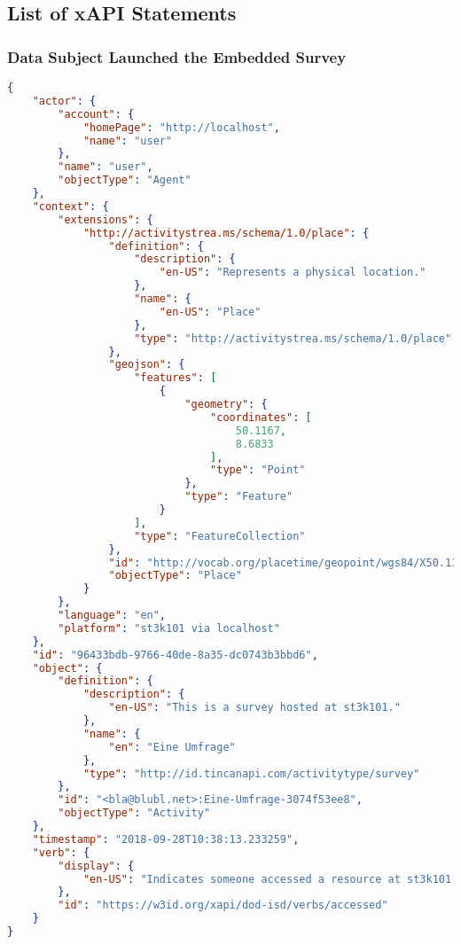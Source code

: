 \subsection{List of xAPI Statements}

\subsubsection*{Data Subject Launched the Embedded Survey}
\begin{lstlisting}[language=JSON]
{
    "actor": {
        "account": {
            "homePage": "http://localhost",
            "name": "user"
        },
        "name": "user",
        "objectType": "Agent"
    },
    "context": {
        "extensions": {
            "http://activitystrea.ms/schema/1.0/place": {
                "definition": {
                    "description": {
                        "en-US": "Represents a physical location."
                    },
                    "name": {
                        "en-US": "Place"
                    },
                    "type": "http://activitystrea.ms/schema/1.0/place"
                },
                "geojson": {
                    "features": [
                        {
                            "geometry": {
                                "coordinates": [
                                    50.1167,
                                    8.6833
                                ],
                                "type": "Point"
                            },
                            "type": "Feature"
                        }
                    ],
                    "type": "FeatureCollection"
                },
                "id": "http://vocab.org/placetime/geopoint/wgs84/X50.1167Y8.6833.html",
                "objectType": "Place"
            }
        },
        "language": "en",
        "platform": "st3k101 via localhost"
    },
    "id": "96433bdb-9766-40de-8a35-dc0743b3bbd6",
    "object": {
        "definition": {
            "description": {
                "en-US": "This is a survey hosted at st3k101."
            },
            "name": {
                "en": "Eine Umfrage"
            },
            "type": "http://id.tincanapi.com/activitytype/survey"
        },
        "id": "<bla@blubl.net>:Eine-Umfrage-3074f53ee8",
        "objectType": "Activity"
    },
    "timestamp": "2018-09-28T10:38:13.233259",
    "verb": {
        "display": {
            "en-US": "Indicates someone accessed a resource at st3k101."
        },
        "id": "https://w3id.org/xapi/dod-isd/verbs/accessed"
    }
}
\end{lstlisting}


